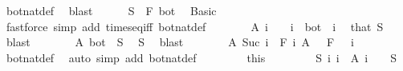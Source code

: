 \begin{isabellebody}
\ bot{\isacharunderscore}{\kern0pt}nat{\isacharunderscore}{\kern0pt}def\ \isamarkupfalse%
\ blast\isanewline
\ \ \ \ \isamarkupfalse%
\ {\isachardoublequoteopen}S\ {\isasymin}\ F\ bot{\isachardoublequoteclose}\ \isamarkupfalse%
\ Basic\ \isamarkupfalse%
\ {\isacharparenleft}{\kern0pt}fastforce\ simp\ add{\isacharcolon}{\kern0pt}\ times{\isacharunderscore}{\kern0pt}eq{\isacharunderscore}{\kern0pt}iff\ bot{\isacharunderscore}{\kern0pt}nat{\isacharunderscore}{\kern0pt}def{\isacharparenright}{\kern0pt}\isanewline
\ \ \ \ \isamarkupfalse%
\ \isamarkupfalse%
\ {\isachardoublequoteopen}A\ i\ {\isacharequal}{\kern0pt}\ {\isacharbraceleft}{\kern0pt}{\isacharbraceright}{\kern0pt}{\isachardoublequoteclose}\ \ {\isachardoublequoteopen}i\ {\isasymnoteq}\ bot{\isachardoublequoteclose}\ \ i\ \isamarkupfalse%
\ that\ S\ \isamarkupfalse%
\ blast\isanewline
\ \ \ \ \isamarkupfalse%
\ \isamarkupfalse%
\ {\isachardoublequoteopen}A\ bot\ {\isacharequal}{\kern0pt}\ S{\isachardoublequoteclose}\ \isamarkupfalse%
\ S\ \isamarkupfalse%
\ blast\isanewline
\ \ \ \ \isamarkupfalse%
\ \isamarkupfalse%
\ {\isachardoublequoteopen}A\ {\isacharparenleft}{\kern0pt}Suc\ i{\isacharparenright}{\kern0pt}\ {\isasymin}\ F\ i{\isachardoublequoteclose}\ {\isachardoublequoteopen}A\ {}\ {\isasymin}\ F\ {}{\isachardoublequoteclose}\ \ i\ \isamarkupfalse%
\ bot{\isacharunderscore}{\kern0pt}nat{\isacharunderscore}{\kern0pt}def\ \isamarkupfalse%
\ {\isacharparenleft}{\kern0pt}auto\ simp\ add{\isacharcolon}{\kern0pt}\ bot{\isacharunderscore}{\kern0pt}nat{\isacharunderscore}{\kern0pt}def{\isacharparenright}{\kern0pt}\isanewline
\ \ \isacommand{{\isacharbraceright}{\kern0pt}}\isamarkupfalse%
\isanewline
\ \ \isamarkupfalse%
\ {\isacharasterisk}{\kern0pt}\ {\isacharequal}{\kern0pt}\ this\isanewline
\ \ \isacommand{{\isacharbraceleft}{\kern0pt}}\isamarkupfalse%
\isanewline
\ \ \ \ \isamarkupfalse%
\ {\isachardoublequoteopen}{\isasymnexists}S{\isachardot}{\kern0pt}\ {\isacharparenleft}{\kern0pt}{\isasymUnion}i{\isachardot}{\kern0pt}\ {\isacharbraceleft}{\kern0pt}i{\isacharbraceright}{\kern0pt}\ {\isasymtimes}\ A\ i{\isacharparenright}{\kern0pt}\ {\isacharequal}{\kern0pt}\ {\isacharbraceleft}{\kern0pt}{}{\isacharbraceright}{\kern0pt}\ {\isasymtimes}\ S{\isachardoublequoteclose}\isanewline

\end{isabellebody}
